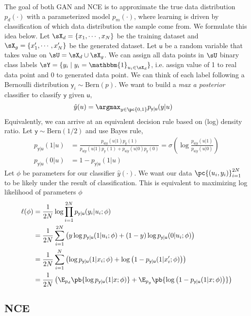 \documentclass[11pt]{article}
\newcommand\ry{\ensuremath{\mathsf{y}}}
\newcommand\ru{\ensuremath{\mathsf{u}}}
\begin{document}
The goal of both GAN and NCE is to approximate the true data distribution $p_d(\cdot)$ with a parameterized model $p_m(\cdot)$, where learning is driven by classification of which data distribution the sample come from. We formulate this idea below. Let $\sX_d = \{x_1,\cdots,x_N\}$ be the training dataset and $\sX_g = \{x_1',\cdots,x_N'\}$ be the generated dataset. Let $\ru$ be a random variable that takes value on $\sU = \sX_d\cup \sX_g$. We can assign all data points in $\sU$ binary class labels $\sY = \{y_i \mid y_i = \mathbbm{1}_{u_i\in \sX_d} \}$, i.e. assign value of 1 to real data point and 0 to generated data point. We can think of each label following a Bernoulli distribution $\ry_i\sim\text{Bern}(p)$. We want to build a \textit{max a posterior} classifier to classify $\ry$ given $\ru$,
\begin{align*}
    \hat{y}(u) 
        &= \argmax_{y\in\pc{0,1}} p_{\ry|\ru}(y|u)
\end{align*}
Equivalently, we can arrive at an equivalent decision rule based on (log) density ratio. Let $\ry\sim\text{Bern}(1/2)$ and use Bayes rule,
\begin{align*}
    p_{\ry|\ru}(1|u)
        &= \frac{ p_{\ru|\ry}(u|1)p_{\ry}(1) }{ p_{\ru|\ry}(u|1)p_{\ry}(1) + p_{\ru|\ry}(u|0)p_{\ry}(0) } 
        = \sigma\left(
            \log \frac{ p_{\ru|\ry}(u|1) }{ p_{\ru|\ry}(u|0) }
        \right) \\
    p_{\ry|\ru}(0|u)
        &= 1 - p_{\ry|\ru}(1|u)
\end{align*}
Let $\phi$ be parameters for our classifier $\hat{y}(\cdot)$. We want our data $\pc{(u_i,y_i)}_{i=1}^{2N}$ to be likely under the result of classification. This is equivalent to maximizing log likelihood of parameters $\phi$
\begin{align}
    \label{eq:1}
    \ell(\phi)
        &= \frac{1}{2N} \log \prod_{i=1}^{2N} p_{\ry|\ru}(y_i|u_i;\phi) \notag \\
        &= \frac{1}{2N} \sum_{i=1}^{2N}\left(  y\log p_{\ry|\ru}(1|u_i;\phi) + (1-y) \log p_{\ry|\ru}(0|u_i;\phi) \right) \notag\\
        &= \frac{1}{2N} \sum_{i=1}^{N} \left(  \log p_{\ry|\ru}(1|x_i;\phi) + \log \left( 1- p_{\ry|\ru}(1|x_i';\phi) \right)  \right) \notag\\
        &= \frac{1}{2N} \left( \E_{p_d}\pb{ \log p_{\ry|\ru}(1|x;\phi) } +  \E_{p_g}\pb{ \log \left( 1- p_{\ry|\ru}(1|x;\phi) \right) } \right)
\end{align}

\subsection{NCE}
\end{document}
